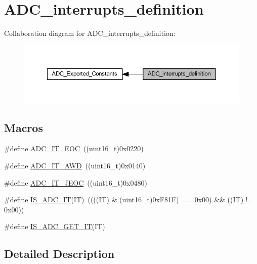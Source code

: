 \hypertarget{group___a_d_c__interrupts__definition}{}\section{A\+D\+C\+\_\+interrupts\+\_\+definition}
\label{group___a_d_c__interrupts__definition}
Collaboration diagram for A\+D\+C\+\_\+interrupts\+\_\+definition\+:
\nopagebreak
\begin{figure}[H]
\begin{center}
\leavevmode
\includegraphics[width=350pt]{group___a_d_c__interrupts__definition}
\end{center}
\end{figure}
\subsection*{Macros}
\begin{DoxyCompactItemize}
\item 
\#define \hyperlink{group___a_d_c__interrupts__definition_ga0ad335d835f54415194d448019569e00}{A\+D\+C\+\_\+\+I\+T\+\_\+\+E\+OC}~((uint16\+\_\+t)0x0220)
\item 
\#define \hyperlink{group___a_d_c__interrupts__definition_ga2f5c7f9900c24250a0c6ccaa7cbca946}{A\+D\+C\+\_\+\+I\+T\+\_\+\+A\+WD}~((uint16\+\_\+t)0x0140)
\item 
\#define \hyperlink{group___a_d_c__interrupts__definition_gad439fc0cd69706704d47aeabfeddb631}{A\+D\+C\+\_\+\+I\+T\+\_\+\+J\+E\+OC}~((uint16\+\_\+t)0x0480)
\item 
\#define \hyperlink{group___a_d_c__interrupts__definition_gaf5f8d35930becff402eeb8220641432f}{I\+S\+\_\+\+A\+D\+C\+\_\+\+IT}(IT)~((((IT) \& (uint16\+\_\+t)0x\+F81\+F) == 0x00) \&\& ((\+I\+T) != 0x00))
\item 
\#define \hyperlink{group___a_d_c__interrupts__definition_gacae69f04de1a0033f065864d868c006e}{I\+S\+\_\+\+A\+D\+C\+\_\+\+G\+E\+T\+\_\+\+IT}(IT)
\end{DoxyCompactItemize}


\subsection{Detailed Description}


